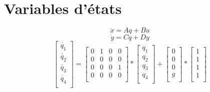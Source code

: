 \documentclass{article}
\begin{document}
\section{Variables d'états}
\begin{equation}
\dot{x} = Aq + Bu
\end{equation}
\begin{equation}
\dot{y} = Cq + Dy
\end{equation}
\begin{equation}
  	\begin{bmatrix}
  	\dot{q_{1}} \\ 
  	\dot{q_{2}} \\ 
  	\dot{q_{3}} \\ 
  	\dot{q_{4}} \\
  	\end{bmatrix}
  	=
  	\begin{bmatrix}
  	0 & 1 & 0 & 0 \\ 
  	0 & 0 & 0 & 0 \\ 
  	0 & 0 & 0 & 1 \\ 
  	0 & 0 & 0 & 0 \\
  	\end{bmatrix}
  	*
  	\begin{bmatrix}
  	q_{1} \\ 
  	q_{2} \\ 
  	q_{3} \\ 
  	q_{4} \\
  	\end{bmatrix}
  	+
  	\begin{bmatrix}
  	0 \\ 
  	0 \\ 
  	0 \\ 
  	g \\
  	\end{bmatrix}
  	*
  	\begin{bmatrix}
  	1 \\ 
  	1 \\ 
  	1 \\ 
  	1 \\
  	\end{bmatrix}
\end{equation}
\end{document}
